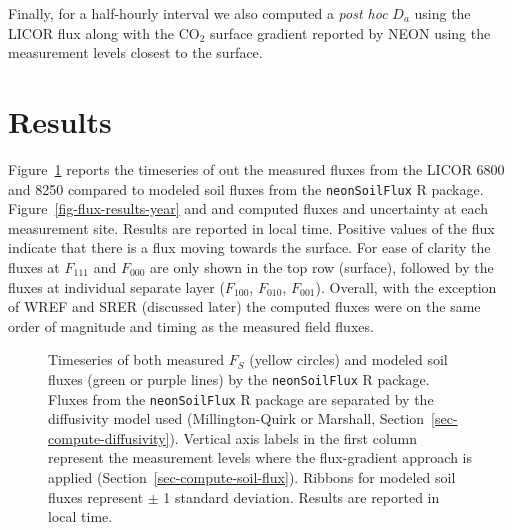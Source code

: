 \documentclass[
  letterpaper,
  DIV=11,
  numbers=noendperiod]{scrartcl}
\begin{document}
Finally, for a half-hourly interval we also computed a \emph{post hoc}
\(D_{a}\) using the LICOR flux along with the CO\(_{2}\) surface
gradient reported by NEON using the measurement levels closest to the
surface.

\section{Results}\label{results}

Figure~\ref{fig-flux-results} reports the timeseries of out the measured
fluxes from the LICOR 6800 and 8250 compared to modeled soil fluxes from
the \texttt{neonSoilFlux} R package. Figure~\ref{fig-flux-results-year}
and and computed fluxes and uncertainty at each measurement site.
Results are reported in local time. Positive values of the flux indicate
that there is a flux moving towards the surface. For ease of clarity the
fluxes at \(F_{111}\) and \(F_{000}\) are only shown in the top row
(surface), followed by the fluxes at individual separate layer
(\(F_{100}\), \(F_{010}\), \(F_{001}\)). Overall, with the exception of
WREF and SRER (discussed later) the computed fluxes were on the same
order of magnitude and timing as the measured field fluxes.

\begin{figure}


\caption{\label{fig-flux-results}Timeseries of both measured \(F_{S}\)
(yellow circles) and modeled soil fluxes (green or purple lines) by the
\texttt{neonSoilFlux} R package. Fluxes from the \texttt{neonSoilFlux} R
package are separated by the diffusivity model used (Millington-Quirk or
Marshall, Section~\ref{sec-compute-diffusivity}). Vertical axis labels
in the first column represent the measurement levels where the
flux-gradient approach is applied (Section~\ref{sec-compute-soil-flux}).
Ribbons for modeled soil fluxes represent \(\pm\) 1 standard deviation.
Results are reported in local time.}

\end{figure}%
\end{document}
